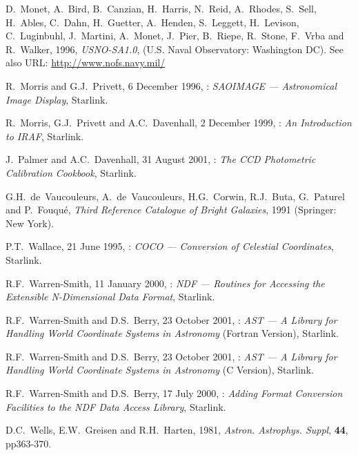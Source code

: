 \documentclass[twoside,11pt]{starlink}
\begin{document}
\begin{thebibliography}{99}
   D.~Monet, A.~Bird, B.~Canzian, H.~Harris, N.~Reid,
   A.~Rhodes, S.~Sell, H.~Ables, C.~Dahn, H.~Guetter, A.~Henden,
   S.~Leggett, H.~Levison, C.~Luginbuhl, J.~Martini, A.~Monet, J.~Pier,
   B.~Riepe, R.~Stone, F.~Vrba and R.~Walker,
   1996, \textit{USNO-SA1.0}, (U.S. Naval Observatory: Washington DC).
   See also URL: \url{http://www.nofs.navy.mil/}

   R.~Morris and G.J.~Privett, 6 December 1996,
   : \textit{SAOIMAGE --- Astronomical Image
   Display}, Starlink.

   R.~Morris, G.J.~Privett and A.C.~Davenhall, 2 December 1999,
   : \textit{An Introduction to IRAF}, Starlink.

   J.~Palmer and A.C.~Davenhall, 31 August 2001,
   : \textit{The CCD Photometric Calibration Cookbook},
   Starlink.

   G.H.~de~Vaucouleurs, A.~de~Vaucouleurs, H.G.~Corwin,
   R.J.~Buta, G.~Paturel and P.~Fouqu\'{e}, \textit{Third Reference
   Catalogue of Bright Galaxies}, 1991 (Springer: New York).

   P.T.~Wallace, 21 June 1995, :
   \textit{COCO --- Conversion of Celestial Coordinates}, Starlink.

   R.F.~Warren-Smith, 11 January 2000,
   : \textit{NDF --- Routines for Accessing the
   Extensible N-Dimensional Data Format}, Starlink.

   R.F.~Warren-Smith and D.S.~Berry, 23 October 2001,
   : \textit{AST --- A Library for Handling
   World Coordinate Systems in Astronomy} (Fortran Version), Starlink.

   R.F.~Warren-Smith and D.S.~Berry, 23 October 2001,
   : \textit{AST --- A Library for Handling
   World Coordinate Systems in Astronomy} (C Version), Starlink.

   R.F.~Warren-Smith and D.S.~Berry, 17 July 2000,
   : \textit{Adding Format Conversion Facilities to
   the NDF Data Access Library}, Starlink.

   D.C.~Wells, E.W.~Greisen and R.H.~Harten, 1981,
   \textit{Astron. Astrophys. Suppl}, \textbf{44}, pp363-370.

\end{thebibliography}


\typeout{  }
\typeout{*****************************************************}
\typeout{  }
\typeout{  }
\typeout{*****************************************************}
\typeout{  }
\end{document}
